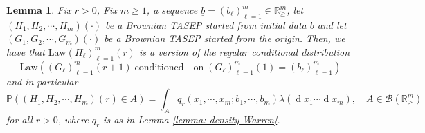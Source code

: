 \documentclass[11pt, reqno]{amsart}
\numberwithin{equation}{section}
\newcounter{dummy} \numberwithin{dummy}{section}
\newtheorem{lemma}[dummy]{Lemma}
\newcommand{\R}{\ensuremath{\mathbb{R}}}
\newcommand{\PP}{\ensuremath{\mathbb{P}}}
\newcommand{\diff}{\ensuremath{\operatorname{d}\!}}
\begin{document}
\begin{lemma}\label{lemma: Warren Markov density}
Fix $r>0$, Fix $m\ge 1$, a sequence $\underline{b} = (b_\ell)_{\ell =1}^m \in\R^m_{\ge}$, let $(H_1, H_2, \cdots, H_m)(\cdot)$ be a Brownian TASEP started from initial data $\underline{b}$ and  let $(G_1, G_2, \cdots, G_m)(\cdot)$ be a Brownian TASEP started from the origin. Then, we have that $\mathrm{Law}(H_\ell)_{\ell =1}^m(r)$ is a version of the regular conditional distribution\\
\[\mathrm{Law}\left((G_\ell)_{\ell =1}^m(r + 1)\right. \;\mathrm{conditioned\quad on }\;\left.(G_\ell)_{\ell =1}^m(1) = (b_\ell)_{\ell =1}^m\right)\] 
and in particular 
\begin{equation*}
     \PP((H_1, H_2, \cdots, H_m)(r)\in A)  = \displaystyle\int_{A} q_r(x_1, \cdots, x_m; b_1, \cdots, b_m)\lambda(\diff x_1\cdots \diff x_m), \quad A\in \mathcal{B}(\R^m_\ge)
\end{equation*}
for all $r>0$, where $q_r$ is as in Lemma \ref{lemma: density Warren}.
\end{lemma}
\end{document}
